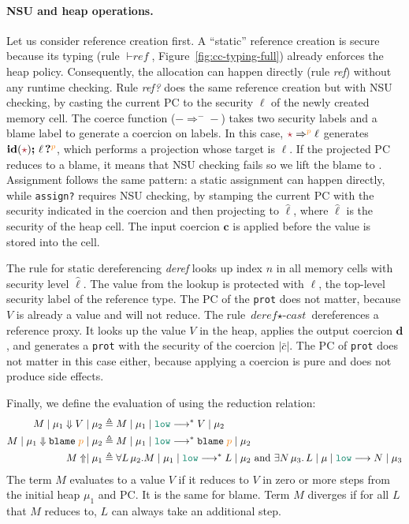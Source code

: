 \paragraph{NSU and heap operations.} Let us consider reference creation
first. A ``static'' reference creation is secure because its typing (rule
${\vdash}\textit{ref}$, Figure~\ref{fig:cc-typing-full}) already enforces the
heap policy. Consequently, the allocation can happen directly (rule
\textit{ref}) without any runtime checking. Rule \textit{ref?} does the same
reference creation but with NSU checking, by casting the current PC to the
security $\ell$ of the newly created memory cell. The coerce function
(${-}\Rightarrow^{-}{-}$) takes two security labels and a blame label to
generate a coercion on labels. In this case, $\unk \Rightarrow^{\bl{p}} \ell$
generates $\id{\unk}\seq\proj{\ell}{p}$, which performs a projection whose
target is $\ell$. If the projected PC reduces to a blame, it means that NSU
checking fails so we lift the blame to \CC. Assignment follows the same pattern:
a static assignment can happen directly, while \texttt{assign?} requires NSU
checking, by stamping the current PC with the security indicated in the coercion
and then projecting to $\hat{\ell}$, where $\hat{\ell}$ is the security of the
heap cell. The input coercion $\bm{c}$ is applied before the value is stored
into the cell.

The rule for static dereferencing \textit{deref} looks up index $n$ in
all memory cells with security level $\hat{\ell}$. The value from the
lookup is protected with $\ell$, the top-level security label of the
reference type. The PC of the \texttt{prot} does not matter, because
$V$ is already a value and will not reduce.
The rule $\textit{deref}{\star}\textit{-cast}$ dereferences a reference proxy.
It looks up the value $V$ in the heap, applies the output coercion $\bm{d}$,
and generates a \texttt{prot} with the security of the coercion $|\bar{c}|$.
The PC of \texttt{prot} does not matter in this case either, because
applying a coercion is pure and does not produce side effects.


Finally, we define the evaluation of \CC using the reduction relation:
{\small
\begin{align*}
  M \mid \mu_1 \Downarrow V \mid \mu_2 &\triangleq \reducemult{M}{\mu_1}{\low}{V}{\mu_2} \\
  M \mid \mu_1 \Downarrow \blame{\bl{p}} \mid \mu_2 &\triangleq \reducemult{M}{\mu_1}{\low}{\blame{\bl{p}}}{\mu_2} \\
  M \Uparrow \mid \mu_1 &\triangleq \forall L\,\mu_2.\reducemult{M}{\mu_1}{\low}{L}{\mu_2} \text{~and~} \exists N\,\mu_3.\,\reduce{L}{\mu}{\low}{N}{\mu_3}
\end{align*}}
\noindent The \CC term $M$ evaluates to a value $V$ if it reduces to $V$ in zero
or more steps from the initial heap $\mu_1$ and \low PC. It is the same for
blame. Term $M$ diverges if for all $L$ that $M$ reduces to, $L$ can always take
an additional step.


